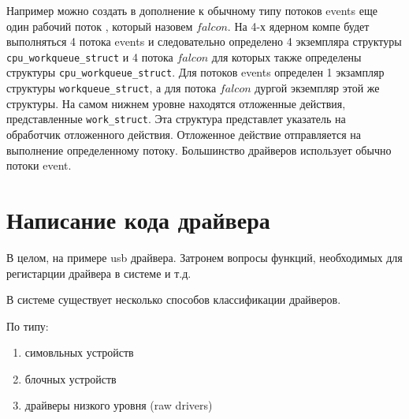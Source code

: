 Например можно создать в дополнение к обычному типу потоков events еще один рабочий поток , который назовем $falcon$. На 4-х ядерном компе будет выполняться 4 потока events и следовательно определено 4 экземпляра структуры \verb|cpu_workqueue_struct| и 4 потока $falcon$   для которых также определены структуры  \verb|cpu_workqueue_struct|. Для потоков events определен 1 экзампляр структуры \verb|workqueue_struct|, а для потока $falcon$ дургой экземпляр этой же структуры. 
На самом нижнем уровне находятся отложенные действия, представленные \verb|work_struct|. Эта структура представлет указатель на обработчик отложенного действия. Отложенное действие отправляется на выполнение определенному потоку. Большинство драйверов использует обычно потоки event.

\chapter{Написание кода драйвера}
В целом, на примере usb драйвера. Затронем вопросы функций, необходимых для регистарции драйвера в системе и т.д.

В системе существует несколько способов классификации драйверов.

По типу:
\begin{enumerate}
	\item симовльных устройств
	\item блочных устройств
	\item драйверы низкого уровня (raw drivers)
\end{enumerate}

